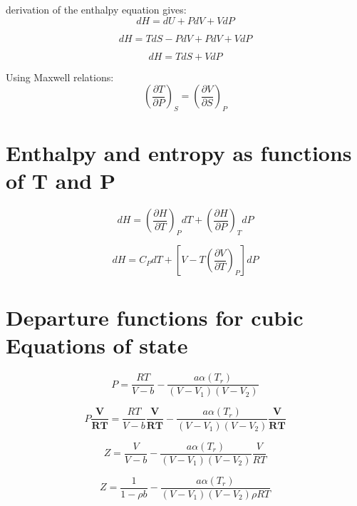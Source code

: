 \documentclass{article}
\begin{document}
derivation of the enthalpy equation gives:
\begin{equation}
    dH = dU + PdV + VdP
\end{equation}

\begin{equation}
    dH = TdS - PdV + PdV + VdP
\end{equation}

\begin{equation}
    dH = TdS + VdP
\end{equation}

Using Maxwell relations: 
\begin{equation}
    \left(\frac{\partial T}{\partial P}\right)_S = \left(\frac{\partial V}{\partial S}\right)_P 
\end{equation}


\section{Enthalpy and entropy as functions of T and P}
\begin{equation}
    dH = \left(\frac{\partial H}{\partial T}\right)_P dT + \left(\frac{\partial H}{\partial P}\right)_T dP 
\end{equation}

\begin{equation}
    dH = C_PdT + \left[V - T\left(\frac{\partial V}{\partial T}\right)_P \right]dP
\end{equation}

\section{Departure functions for cubic Equations of state}

\begin{equation}
    P=\frac{RT}{V-b} - \frac{a\alpha(T_r)}{(V-V_1)(V-V_2)}
\end{equation}

\begin{equation*}
    P\boldsymbol{\frac{V}{RT}}=\frac{RT}{V-b}\boldsymbol{\frac{V}{RT}} - \frac{a\alpha(T_r)}{(V-V_1)(V-V_2)}\boldsymbol{\frac{V}{RT}}
\end{equation*}

\begin{equation*}
    Z = \frac{V}{V-b} - \frac{a\alpha(T_r)}{(V-V_1)(V-V_2)}\frac{V}{RT} 
\end{equation*}

\begin{equation*}
    Z = \frac{1}{1-\rho b} - \frac{a\alpha(T_r)}{(V-V_1)(V-V_2)\rho RT}   
\end{equation*}
\end{document}
